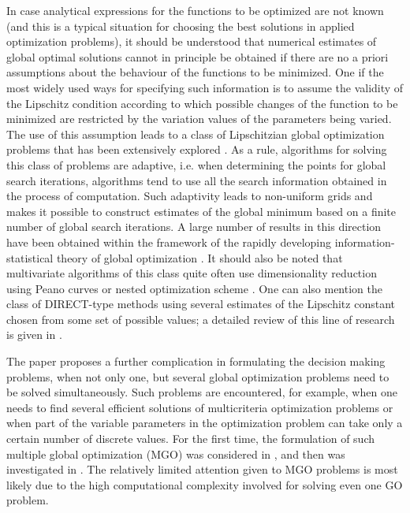 \documentclass[review]{elsarticle}
\begin{document}
In case analytical expressions for the functions to be optimized are not known (and this is a typical situation for choosing the best solutions in applied optimization problems), it should be understood that numerical estimates of global optimal solutions cannot in principle be obtained if there are no a priori assumptions about the behaviour of the functions to be minimized. One if the most widely used ways for specifying such information is to assume the validity of the Lipschitz condition according to which possible changes of the function to be minimized are restricted by the variation values of the parameters being varied. The use of this assumption leads to a class of Lipschitzian global optimization problems that has been extensively explored \cite{c3,c6,c7,c19,c19,c20,c21,c22,c23}.  As a rule, algorithms for solving this class of problems are adaptive, i.e. when determining the points for global search iterations, algorithms tend to use all the search information obtained in the process of computation. Such adaptivity leads to non-uniform grids and makes it possible to construct estimates of the global minimum based on a finite number of global search iterations. A large number of results in this direction have been obtained within the framework of the rapidly developing information-statistical theory of global optimization \cite{c6}. It should also be noted that multivariate algorithms of this class quite often use dimensionality reduction using Peano curves or nested optimization scheme \cite{c23}. One can also mention the class of DIRECT-type methods using several estimates of the Lipschitz constant chosen from some set of possible values; a detailed review of this line of research is given in \cite{c22}.


The paper proposes a further complication in formulating the decision making problems, when not only one, but several global optimization problems need to be solved simultaneously. Such problems are encountered, for example, when one needs to find several efficient solutions of multicriteria optimization problems or when part of the variable parameters in the optimization problem can take only a certain number of discrete values. For the first time, the formulation of such multiple global optimization (MGO) was considered in \cite{c25,c26}, and then was investigated in \cite{c27,c28}. The relatively limited attention given to MGO problems is most likely due to the high computational complexity involved for solving even one GO problem.
\end{document}
